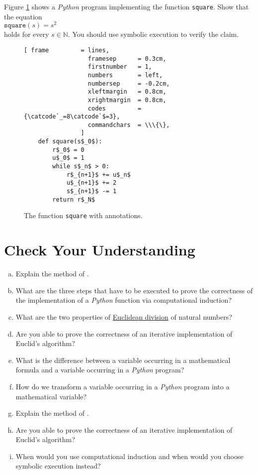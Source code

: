 \exerciseEng
Figure \ref{fig:square-iterative} shows a \textsl{Python} program implementing the function \texttt{square}.  Show that the equation
\\[0.2cm]
\hspace*{1.3cm}
$\mathtt{square}(s) = s^2$
\\[0.2cm]
holds for every $s \in \mathbb{N}$.  You should use symbolic execution to verify the claim.
\eox

\begin{figure}[!ht]
\centering
\begin{Verbatim}[ frame         = lines, 
                  framesep      = 0.3cm, 
                  firstnumber   = 1,
                  numbers       = left,
                  numbersep     = -0.2cm,
                  xleftmargin   = 0.8cm,
                  xrightmargin  = 0.8cm,
                  codes         = {\catcode`_=8\catcode`$=3},
                  commandchars  = \\\{\},
                ]
    def square(s$_0$):
        r$_0$ = 0
        u$_0$ = 1
        while s$_n$ > 0:
            r$_{n+1}$ += u$_n$
            u$_{n+1}$ += 2
            s$_{n+1}$ -= 1
        return r$_N$
\end{Verbatim}
\vspace*{-0.3cm}
\caption{The function \texttt{square} with annotations.}
\label{fig:square-iterative}
\end{figure}

\pagebreak

\section{Check Your Understanding}
\begin{enumerate}[(a)]
\item Explain the method of .  
\item What are the three steps that have to be executed to prove the correctness of the implementation of a
      \textsl{Python} function via computational induction?
\item What are the two properties of \href{https://en.wikipedia.org/wiki/Euclidean_division}{Euclidean division} of natural numbers?
\item Are you able to prove the correctness of an iterative implementation of Euclid's algorithm?
\item What is the difference between a variable occurring in a mathematical formula and a variable occurring in
      a \textsl{Python} program?
\item How do we transform a variable occurring in a \textsl{Python} program into a mathematical variable?
\item Explain the method of .
\item Are you able to prove the correctness of an iterative implementation of Euclid's algorithm?
\item When would you use computational induction and when would you choose symbolic execution instead?
\end{enumerate}

